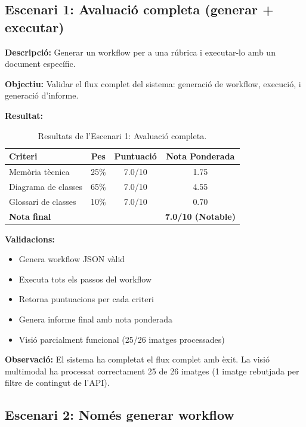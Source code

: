 \documentclass[12pt,a4paper,twoside]{report}
\begin{document}
\subsection{Escenari 1: Avaluaci\'o completa (generar + executar)}

\textbf{Descripci\'o:} Generar un workflow per a una r\'ubrica i executar-lo amb un document espec\'ific.

\textbf{Objectiu:} Validar el flux complet del sistema: generaci\'o de workflow, execuci\'o, i generaci\'o d'informe.

\textbf{Resultat:}

\begin{table}[H]
\centering
\caption{Resultats de l'Escenari 1: Avaluaci\'o completa.}
\label{tab:escenari1}
\begin{tabular}{@{}lccc@{}}
\toprule
\textbf{Criteri} & \textbf{Pes} & \textbf{Puntuaci\'o} & \textbf{Nota Ponderada} \\
\midrule
Mem\`oria t\`ecnica & 25\% & 7.0/10 & 1.75 \\
Diagrama de classes & 65\% & 7.0/10 & 4.55 \\
Glossari de classes & 10\% & 7.0/10 & 0.70 \\
\midrule
\textbf{Nota final} & & & \textbf{7.0/10 (Notable)} \\
\bottomrule
\end{tabular}
\end{table}

\textbf{Validacions:}
\begin{itemize}
    \item Genera workflow JSON v\`alid
    \item Executa tots els passos del workflow
    \item Retorna puntuacions per cada criteri
    \item Genera informe final amb nota ponderada
    \item Visi\'o parcialment funcional (25/26 imatges processades)
\end{itemize}

\textbf{Observaci\'o:} El sistema ha completat el flux complet amb \`exit. La visi\'o multimodal ha processat correctament 25 de 26 imatges (1 imatge rebutjada per filtre de contingut de l'API).

\subsection{Escenari 2: Nom\'es generar workflow}
\end{document}

